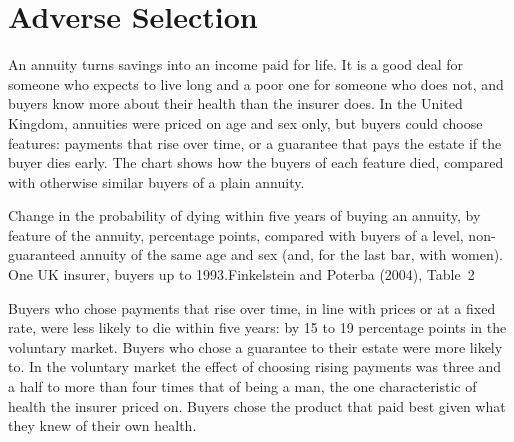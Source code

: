 \chapter{Adverse Selection}\label{ch:b2:adverse-selection}

An annuity turns savings into an income paid for life. It is a good deal for someone who expects to live long
and a poor one for someone who does not, and buyers know more about their health than the insurer does. In the
United Kingdom, annuities were priced on age and sex only, but buyers could choose features: payments that rise
over time, or a guarantee that pays the estate if the buyer dies early. The chart shows how the buyers of each
feature died, compared with otherwise similar buyers of a plain annuity.

\begin{openingchart}{Change in the probability of dying within five years of buying an annuity, by feature of the
  annuity, percentage points, compared with buyers of a level, non-guaranteed annuity of the same age and sex
  (and, for the last bar, with women). One UK insurer, buyers up to 1993.}{Finkelstein and Poterba (2004), Table~2}
\end{openingchart}

Buyers who chose payments that rise over time, in line with prices or at a fixed rate, were less likely to die
within five years: by 15 to 19 percentage points in the voluntary market. Buyers who chose a guarantee to their
estate were more likely to. In the voluntary market the effect of choosing rising payments was three and a half to
more than four times that of being a man, the one characteristic of health the insurer priced on. Buyers chose the product
that paid best given what they knew of their own health.


